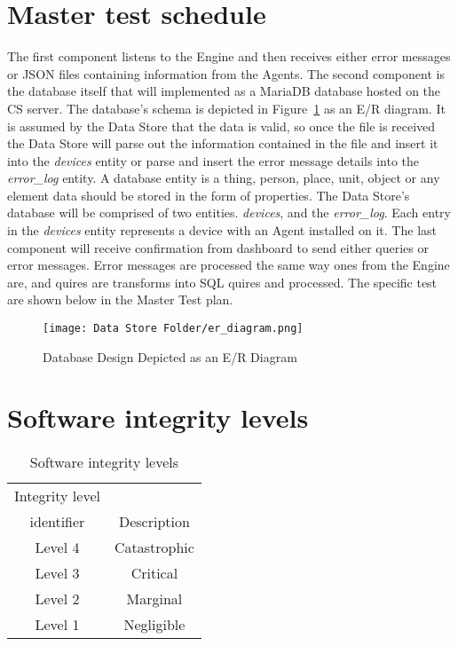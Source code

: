 \documentclass[letterpaper,12pt,oneside,listof=totoc]{scrreprt}
\begin{document}
\section{Master test schedule}
The first component listens to the Engine and then receives either error messages or JSON files containing information from the Agents. 
The second component is the database itself that will implemented as a MariaDB database hosted on the CS server. The database's schema is depicted in Figure~\ref{erdiagram} as an E/R diagram.
It is assumed by the Data Store that the data is valid, so once the file is received the Data Store will parse out the information contained in the file and insert it into the \textit{devices} entity or parse and insert the error message details into the \textit{error_log} entity. A database entity is a thing, person, place, unit, object or any element data should be stored in the form of properties. The Data Store's database will be comprised of two entities. \textit{devices}, and the \textit{error_log}. Each entry in the \textit{devices} entity represents a device with an Agent installed on it. 
The last component will receive confirmation from dashboard to send either queries or error messages. Error messages are processed the same way ones from the Engine are, and quires are transforms into SQL quires and processed. 
The specific test are shown below in the Master Test plan.

\begin{figure}[H]
\texttt{[image: Data Store Folder/er\_diagram.png]}
\caption{Database Design Depicted as an E/R Diagram}
\label{erdiagram}
\end{figure}


\section{Software integrity levels}
\begin{table}[H]
\centering
\caption{Software integrity levels}
\begin{tabular}{|c|c|}
\hline
Integrity level & \\
identifier      & Description \\
\hline
Level 4         & Catastrophic \\
Level 3         & Critical \\
Level 2         & Marginal \\
Level 1         & Negligible \\
\hline
\end{tabular}
\label{sils}
\end{table}
\end{document}
